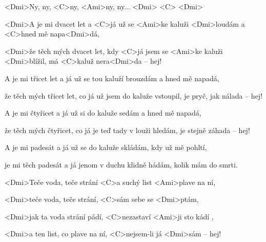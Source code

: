

\zr
<Dmi>Ny, ny, <C>ny, <Ami>ny, ny... <Dmi> <C> <Dmi>
\kr

\zs
<Dmi>A je mi dvacet let a <C>já už se
<Ami>ke kaluži <Dmi>loudám a <C>hned mě napa<Dmi>dá,

<Dmi>že těch mých dvacet let,
kdy <C>já jsem se <Ami>ke kaluži <Dmi>blížil,
má <C>kaluž nera<Dmi>da -- hej!
\ks

\zr \kr

\zs
A je mi třicet let a já už se
tou kaluží brouzdám a hned mě napadá,

že těch mých třicet let,
co já už jsem do kaluže vstoupil,
je pryč, jak nálada -- hej!
\ks

\zr \kr

\zs
A je mi čtyřicet a já už si
do kaluže sedám a hned mě napadá,

že těch mých čtyřicet,
co já je teď tady v louži hledám,
je stejně záhada -- hej!
\ks

\zr \kr

\zs
A je mi padesát a já už se
do kaluže skládám, kdy už mě pohltí,

je mi těch padesát
a já jenom v duchu klidně hádám,
kolik mám do smrti.
\ks

\zs
<Dmi>Teče voda, teče strání
<C>a suchý list <Ami>plave na ní,

<Dmi>teče voda, teče strání,
<C>sám sebe se <Dmi>ptám,

<Dmi>jak ta voda strání pádí,
<C>nezastaví <Ami>ji sto kádí ,

<Dmi>a ten list, co plave na ní,
<C>nejsem-li já <Dmi>sám -- hej!
\ks

\zr \kr

\kp
